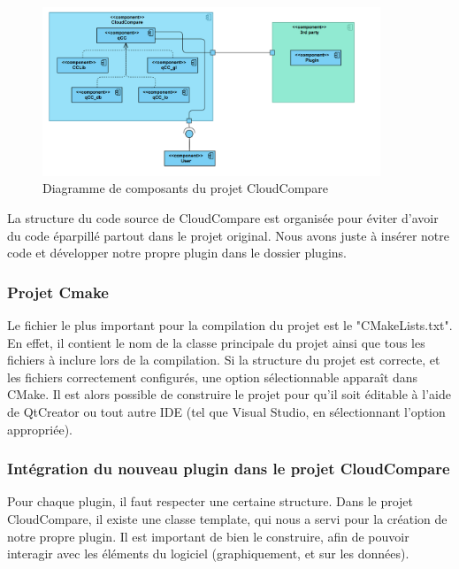 \documentclass[12pt,titlepage,french]{article}
\begin{document}
\begin{figure}[H]
\center
  \includegraphics[width=0.9\textwidth]{./img/component_diagr.png}
  \caption{\label{} Diagramme de composants du projet CloudCompare}
\end{figure}

La structure du code source de CloudCompare est organisée pour éviter d'avoir du code éparpillé partout dans le projet original. Nous avons juste à insérer notre code et développer notre propre plugin dans le dossier plugins.

\subsubsection{Projet Cmake}

Le fichier le plus important pour la compilation du projet est le "CMakeLists.txt". En effet, il contient le nom de la classe principale du projet ainsi que tous les fichiers à inclure lors de la compilation.
Si la structure du projet est correcte, et les fichiers correctement configurés, une option sélectionnable apparaît dans CMake.
Il est alors possible de construire le projet pour qu'il soit éditable à l'aide de QtCreator ou tout autre IDE (tel que Visual Studio, en sélectionnant l'option appropriée).

\subsubsection{Intégration du nouveau plugin dans le projet CloudCompare}

Pour chaque plugin, il faut respecter une certaine structure. Dans le projet CloudCompare, il existe une classe template, qui nous a servi pour la création de notre propre plugin. Il est important de bien le construire, afin de pouvoir interagir avec les éléments du logiciel (graphiquement, et sur les données). \newline
\end{document}
